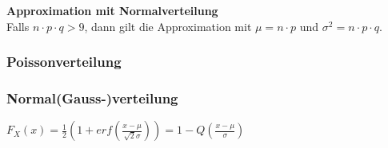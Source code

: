 \textbf{Approximation mit Normalverteilung} \\
\hspace*{0.2cm} Falls $n \cdot p \cdot q > 9$, dann gilt die Approximation mit $\mu = n \cdot p$ und
$\sigma^2 = n \cdot p \cdot q$.
\vspace{-0.2cm}

\subsubsection{Poissonverteilung }
\subsubsection{Normal(Gauss-)verteilung }
\hspace*{0.2cm} $F_X(x) = \frac{1}{2}(1+erf(\frac{x-\mu}{\sqrt{2}\sigma})) = 1-Q(\frac{x-\mu}{\sigma}) $